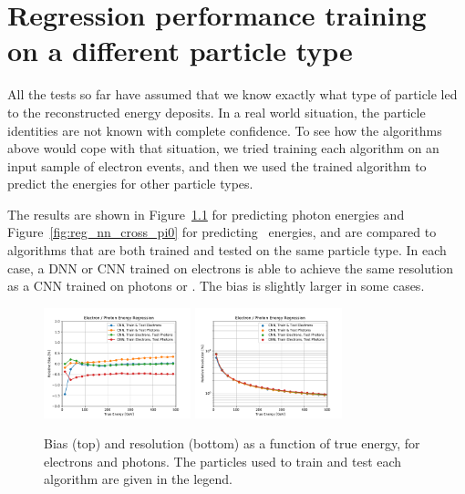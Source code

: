 \chapter{Regression performance training on a different particle type}\label{app:xtrain_regression}

All the tests so far have assumed that we know exactly what type of particle led to the reconstructed energy deposits.  In a real world situation, the particle identities are not known with complete confidence.  To see how the algorithms above would cope with that situation, we tried training each algorithm on an input sample of electron events, and then we used the trained algorithm to predict the energies for other particle types.

The results are shown in Figure~\ref{fig:reg_nn_cross_gamma} for predicting photon energies and Figure~\ref{fig:reg_nn_cross_pi0} for predicting \pizero\ energies, and are compared to algorithms that are both trained and tested on the same particle type.  In each case, a DNN or CNN trained on electrons is able to achieve the same resolution as a CNN trained on photons or \pizero.  The bias is slightly larger in some cases.

\begin{figure}[hbp]
\centering
\includegraphics[width=0.38\textwidth]{Images/Calo/bias_vs_E_EleGammaFixed_nn_cross_zoom.pdf}
\includegraphics[width=0.38\textwidth]{Images/Calo/res_vs_E_EleGammaFixed_nn_cross_fits.pdf}
\caption{Bias (top) and resolution (bottom) as a function of true energy, for electrons and photons.  The particles used to train and test each algorithm are given in the legend.
}
\label{fig:reg_nn_cross_gamma}
\end{figure}

